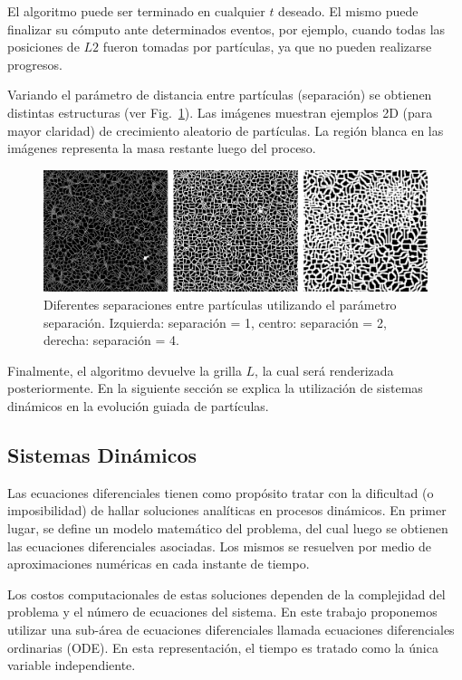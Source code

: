 \documentclass[spanish,a4paper,11pt,oneside,links]{report}
\begin{document}
El algoritmo puede ser terminado en cualquier $t$ deseado. El mismo puede finalizar su c\'omputo ante determinados eventos, por ejemplo, cuando todas las posiciones de $L2$ fueron tomadas por part\'iculas, ya que no pueden realizarse progresos.

Variando el par\'ametro de distancia entre part\'iculas (separación) se obtienen distintas estructuras (ver Fig.~\ref{fg:sistdin1}). Las im\'agenes muestran ejemplos 2D (para mayor claridad) de crecimiento aleatorio de part\'iculas. La regi\'on blanca en las im\'agenes representa la masa restante luego del proceso.


\begin{figure}[htb!]
  \centerline{\includegraphics[scale=0.22]{sistdin1}}
  \caption{Diferentes separaciones entre part\'iculas utilizando el par\'ametro separación. Izquierda: separaci\'on = 1, centro: separaci\'on = 2, derecha: separaci\'on = 4.}
  \label{fg:sistdin1}
\end{figure}

Finalmente, el algoritmo devuelve la grilla $L$, la cual ser\'a renderizada posteriormente. En la siguiente secci\'on se explica la utilizaci\'on de sistemas din\'amicos en la evoluci\'on guiada de part\'iculas.

\subsection{Sistemas Din\'amicos}

Las ecuaciones diferenciales tienen como prop\'osito tratar con la dificultad (o imposibilidad) de hallar soluciones anal\'iticas en procesos din\'amicos. En primer lugar, se define un modelo matem\'atico del problema, del cual luego se obtienen 
las ecuaciones diferenciales asociadas. Los mismos se resuelven por medio de aproximaciones num\'ericas en cada instante de tiempo.

Los costos computacionales de estas soluciones dependen de la complejidad del problema y el n\'umero de ecuaciones del sistema. En este trabajo proponemos utilizar una sub-\'area de ecuaciones diferenciales llamada ecuaciones diferenciales ordinarias (ODE). En esta representaci\'on, el tiempo es tratado como la \'unica variable independiente.
\end{document}
